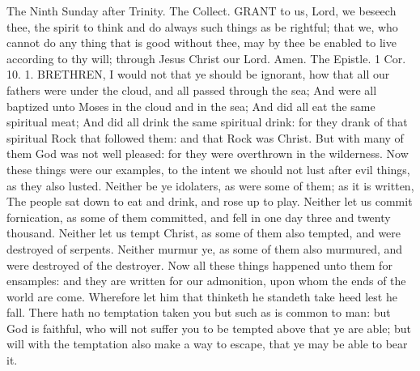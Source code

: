 The Ninth Sunday after Trinity.
The Collect.
GRANT to us, Lord, we beseech thee, the spirit to think and do always such things as be rightful; that we, who cannot do any thing that is good without thee, may by thee be enabled to live according to thy will; through Jesus Christ our Lord. Amen.
The Epistle. 1 Cor. 10. 1.
BRETHREN, I would not that ye should be ignorant, how that all our fathers were under the cloud, and all passed through the sea; And were all baptized unto Moses in the cloud and in the sea; And did all eat the same spiritual meat; And did all drink the same spiritual drink: for they drank of that spiritual Rock that followed them: and that Rock was Christ. But with many of them God was not well pleased: for they were overthrown in the wilderness. Now these things were our examples, to the intent we should not lust after evil things, as they also lusted. Neither be ye idolaters, as were some of them; as it is written, The people sat down to eat and drink, and rose up to play. Neither let us commit fornication, as some of them committed, and fell in one day three and twenty thousand. Neither let us tempt Christ, as some of them also tempted, and were destroyed of serpents. Neither murmur ye, as some of them also murmured, and were destroyed of the destroyer. Now all these things happened unto them for ensamples: and they are written for our admonition, upon whom the ends of the world are come. Wherefore let him that thinketh he standeth take heed lest he fall. There hath no temptation taken you but such as is common to man: but God is faithful, who will not suffer you to be tempted above that ye are able; but will with the temptation also make a way to escape, that ye may be able to bear it.

\subsection{}



